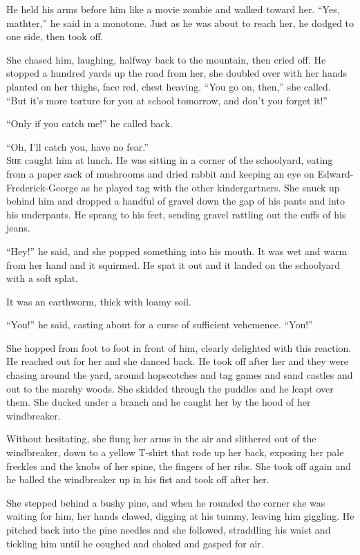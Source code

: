 He held his arms before him like a movie zombie and walked toward her. 
``Yes, mathter,'' he said in a monotone.  Just as he was about to
reach her, he dodged to one side, then took off.

She chased him, laughing, halfway back to the mountain, then cried
off.  He stopped a hundred yards up the road from her, she doubled
over with her hands planted on her thighs, face red, chest heaving. 
``You go on, then,'' she called.  ``But it's more torture for you at
school tomorrow, and don't you forget it!''

``Only if you catch me!'' he called back.

``Oh, I'll catch you, have no fear.''
\\
\lettrine[lines=3, lhang=.5, nindent=0pt, findent=2pt]{S}{he} caught him at lunch.  He was sitting in a corner of the
schoolyard, eating from a paper sack of mushrooms and dried rabbit and
keeping an eye on Edward-Frederick-George as he played tag with the
other kindergartners.  She snuck up behind him and dropped a handful
of gravel down the gap of his pants and into his underpants.  He
sprang to his feet, sending gravel rattling out the cuffs of his
jeans.

``Hey!'' he said, and she popped something into his mouth.  It was wet
and warm from her hand and it squirmed.  He spat it out and it landed
on the schoolyard with a soft splat.

It was an earthworm, thick with loamy soil.

``You!'' he said, casting about for a curse of sufficient vehemence. 
``You!''

She hopped from foot to foot in front of him, clearly delighted with
this reaction.  He reached out for her and she danced back.  He took
off after her and they were chasing around the yard, around
hopscotches and tag games and sand castles and out to the marshy
woods.  She skidded through the puddles and he leapt over them.  She
ducked under a branch and he caught her by the hood of her
windbreaker.

Without hesitating, she flung her arms in the air and slithered out of
the windbreaker, down to a yellow T-shirt that rode up her back,
exposing her pale freckles and the knobs of her spine, the fingers of
her ribs.  She took off again and he balled the windbreaker up in his
fist and took off after her.

She stepped behind a bushy pine, and when he rounded the corner she
was waiting for him, her hands clawed, digging at his tummy, leaving
him giggling.  He pitched back into the pine needles and she followed,
straddling his waist and tickling him until he coughed and choked and
gasped for air.

